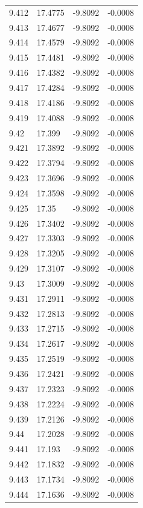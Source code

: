 \begin{tabular}{llll}
9.412 & 17.4775 & -9.8092 & -0.0008 \\
9.413 & 17.4677 & -9.8092 & -0.0008 \\
9.414 & 17.4579 & -9.8092 & -0.0008 \\
9.415 & 17.4481 & -9.8092 & -0.0008 \\
9.416 & 17.4382 & -9.8092 & -0.0008 \\
9.417 & 17.4284 & -9.8092 & -0.0008 \\
9.418 & 17.4186 & -9.8092 & -0.0008 \\
9.419 & 17.4088 & -9.8092 & -0.0008 \\
9.42 & 17.399 & -9.8092 & -0.0008 \\
9.421 & 17.3892 & -9.8092 & -0.0008 \\
9.422 & 17.3794 & -9.8092 & -0.0008 \\
9.423 & 17.3696 & -9.8092 & -0.0008 \\
9.424 & 17.3598 & -9.8092 & -0.0008 \\
9.425 & 17.35 & -9.8092 & -0.0008 \\
9.426 & 17.3402 & -9.8092 & -0.0008 \\
9.427 & 17.3303 & -9.8092 & -0.0008 \\
9.428 & 17.3205 & -9.8092 & -0.0008 \\
9.429 & 17.3107 & -9.8092 & -0.0008 \\
9.43 & 17.3009 & -9.8092 & -0.0008 \\
9.431 & 17.2911 & -9.8092 & -0.0008 \\
9.432 & 17.2813 & -9.8092 & -0.0008 \\
9.433 & 17.2715 & -9.8092 & -0.0008 \\
9.434 & 17.2617 & -9.8092 & -0.0008 \\
9.435 & 17.2519 & -9.8092 & -0.0008 \\
9.436 & 17.2421 & -9.8092 & -0.0008 \\
9.437 & 17.2323 & -9.8092 & -0.0008 \\
9.438 & 17.2224 & -9.8092 & -0.0008 \\
9.439 & 17.2126 & -9.8092 & -0.0008 \\
9.44 & 17.2028 & -9.8092 & -0.0008 \\
9.441 & 17.193 & -9.8092 & -0.0008 \\
9.442 & 17.1832 & -9.8092 & -0.0008 \\
9.443 & 17.1734 & -9.8092 & -0.0008 \\
9.444 & 17.1636 & -9.8092 & -0.0008 \\

\end{tabular}
